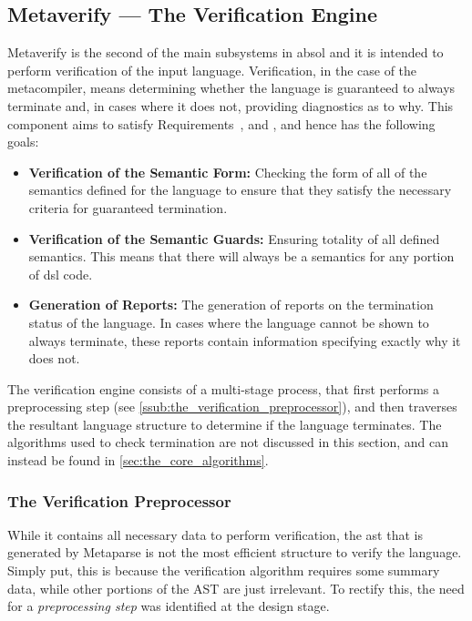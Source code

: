 \subsection{Metaverify --- The Verification Engine} %
\label{sub:metaverify_the_verification_engine}
Metaverify is the second of the main subsystems in \gls{absol} and it is intended to perform verification of the input language. 
Verification, in the case of the metacompiler, means determining whether the language is guaranteed to always terminate and, in cases where it does not, providing diagnostics as to why.
This component aims to satisfy Requirements~,  and , and hence has the following goals:
\begin{itemize}
    \item \textbf{Verification of the Semantic Form:} Checking the form of all of the semantics defined for the language to ensure that they satisfy the necessary criteria for guaranteed termination. 
    \item \textbf{Verification of the Semantic Guards:} Ensuring totality of all defined semantics.
    This means that there will always be a semantics for any portion of \gls{dsl} code. 
    \item \textbf{Generation of Reports:} The generation of reports on the termination status of the language. 
    In cases where the language cannot be shown to always terminate, these reports contain information specifying exactly why it does not. 
\end{itemize}

The verification engine consists of a multi-stage process, that first performs a preprocessing step (see \autoref{ssub:the_verification_preprocessor}), and then traverses the resultant language structure to determine if the language terminates. 
The algorithms used to check termination are not discussed in this section, and can instead be found in \autoref{sec:the_core_algorithms}.

\subsubsection{The Verification Preprocessor} %
\label{ssub:the_verification_preprocessor}
While it contains all necessary data to perform verification, the \gls{ast} that is generated by Metaparse is not the most efficient structure to verify the language. 
Simply put, this is because the verification algorithm requires some summary data, while other portions of the AST are just irrelevant.
To rectify this, the need for a \textit{preprocessing step} was identified at the design stage. \\

